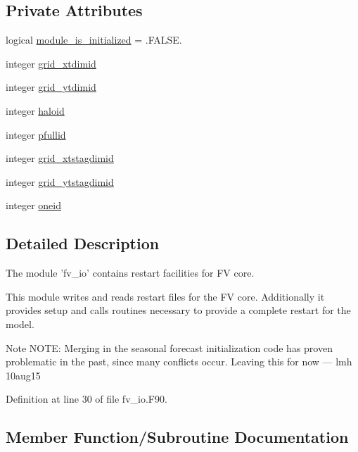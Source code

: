 \subsection*{Private Attributes}
\begin{DoxyCompactItemize}
\item 
logical \hyperlink{classfv__io__mod_a0a0d26eb0411470f9d5d7b50a1fc67c7}{module\-\_\-is\-\_\-initialized} = .F\-A\-L\-S\-E.
\item 
integer \hyperlink{classfv__io__mod_a917a64d0d43975d4b5cc97fd73f73443}{grid\-\_\-xtdimid}
\item 
integer \hyperlink{classfv__io__mod_a08db0ecb707015eb437912010c574d64}{grid\-\_\-ytdimid}
\item 
integer \hyperlink{classfv__io__mod_a8dacc1c38af6da8b113fef3ab953e712}{haloid}
\item 
integer \hyperlink{classfv__io__mod_a8ac7b1dc39c4e3b84676b89697881b7b}{pfullid}
\item 
integer \hyperlink{classfv__io__mod_a0a6f309e19451cffeccc7a6dbffb4ffc}{grid\-\_\-xtstagdimid}
\item 
integer \hyperlink{classfv__io__mod_a5b333b9fc08330f0048a52b3d329ac3d}{grid\-\_\-ytstagdimid}
\item 
integer \hyperlink{classfv__io__mod_ac0e83dcce576d02e4f3f6da1c8d5aeb7}{oneid}
\end{DoxyCompactItemize}


\subsection{Detailed Description}
The module 'fv\-\_\-io' contains restart facilities for F\-V core. 

This module writes and reads restart files for the F\-V core. Additionally it provides setup and calls routines necessary to provide a complete restart for the model. \begin{DoxyNote}{Note}
N\-O\-T\-E\-: Merging in the seasonal forecast initialization code has proven problematic in the past, since many conflicts occur. Leaving this for now --- lmh 10aug15 
\end{DoxyNote}


Definition at line 30 of file fv\-\_\-io.\-F90.



\subsection{Member Function/\-Subroutine Documentation}

